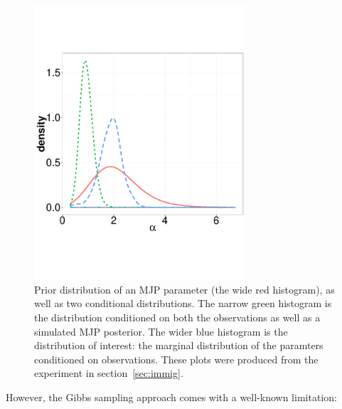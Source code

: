   \begin{figure}%
  \centering
  \begin{minipage}[hp]{0.44\linewidth}
  \centering
    \vspace{-0 in}
    \includegraphics [width=0.7\textwidth, angle=0]{figs/hist_alpha.pdf}
    \vspace{-0 in}
  \end{minipage}
  \begin{minipage}[hp]{0.55\linewidth}
    \vspace{-0.3 in}
  \caption{Prior distribution of an MJP parameter (the wide red histogram),
  as well as two conditional distributions. The narrow green histogram is the
distribution conditioned on both the observations as well as a simulated
MJP posterior. The wider blue histogram is the distribution of interest: the
marginal distribution of the paramters conditioned on observations. These
plots were produced from the experiment in section~\ref{sec:immig}.}
     \label{fig:hist}
  \end{minipage}
  \end{figure}
  However, the Gibbs sampling approach %
  comes with a well-known limitation:
